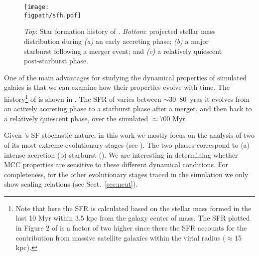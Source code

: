 \IfFileExists{emulateapjlegacy.cls}{\documentclass[iop]{emulateapjlegacy}}{\documentclass[iop]{emulateapj}}
\def\figpath{./Fig}
\begin{document}
\begin{figure*}
\centering
\texttt{[image: \\figpath/sfh.pdf]}
\caption{
    {\it Top}: Star formation history of \flower. {\it Bottom}:
    projected stellar mass distribution during {\it (a)} an early
    accreting phase;  {\it (b)} a major starburst following a merger
    event; and {\it (c)} a relatively quiescent post-starburst
    phase. 
\label{fig:SFH}}
\end{figure*}

One of the main advantages for studying the dynamical properties of simulated galaies is that we can examine how their properties evolve with time.
%
The \SF history\footnote{Note that here the SFR is calculated based on
  the stellar mass formed in the last 10 Myr within 3.5 kpc from the
  galaxy center of mass. The SFR plotted in Figure 2 of
  \citet{Pallottini17b} is a factor of two higher since there the SFR
  accounts for the contribution from massive satellite galaxies within
  the virial radius ($\approx$15\,kpc).} of \flower is shown in
. The SFR of \flower varies between $\sim$30--80 \Msun\,yr\pmOne as it evolves from an actively accreting phase to a starburst phase after a merger, and then back to a relatively quiescent phase, over the simulated $\approx 700$ Myr.

Given \flower's SF stochastic nature, in this work we mostly focus on
the analysis of two of its most extreme evolutionary stages (see
). The two phases correspond to (a) intense accretion
(b) starburst (). We are interesting in determining whether
MCC properties are sensitive to these different dynamical
conditions. For completeness, for the other evolutionary stages traced
in the simulation we only show scaling relations (see 
     Sect.~\ref{sec:ncut}).
\end{document}

